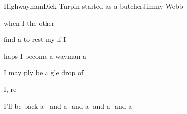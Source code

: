 \begin{SBSong}{Highwayman}{Dick Turpin started as a butcher}{Jimmy Webb}
\begin{SBVerse}
     when I  the other 

     find a  to rest my  if I 

    haps I  become a wayman a-

     I may ply be a gle drop of 

     I,  re-

     I'll be back a-, and a- and a- and a- and a-
  \end{SBVerse}
\end{SBSong}
